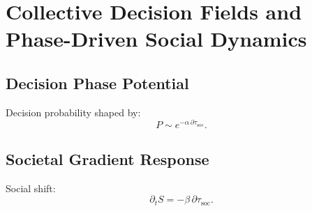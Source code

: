 \chapter{Collective Decision Fields and Phase-Driven Social Dynamics}

\section{Decision Phase Potential}
Decision probability shaped by:
\[
P \sim e^{-\alpha\,\partial\tau_{\mathrm{soc}}}.
\]

\section{Societal Gradient Response}
Social shift:
\[
\partial_t S = -\beta\,\partial\tau_{\mathrm{soc}}.
\]

